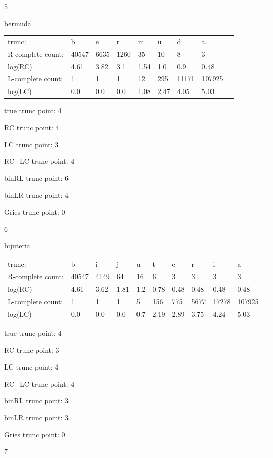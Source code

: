 \documentclass[10pt]{article}
\begin{document}
5

bermuda

\begin{tabular}{l|llllllll}
trunc: & b & e & r & m & u & d & a & \\ 
R-complete count: & 40547 & 6635 & 1260 & 35 & 10 & 8 & 3 & \\ 
log(RC) & 4.61 & 3.82 & 3.1 & 1.54 & 1.0 & 0.9 & 0.48 & \\ 
L-complete count: & 1 & 1 & 1 & 12 & 295 & 11171 & 107925 & \\ 
log(LC) & 0.0 & 0.0 & 0.0 & 1.08 & 2.47 & 4.05 & 5.03 & \\ 
\end{tabular}

true trunc point: 4

RC trunc point: 4

LC trunc point: 3

RC+LC trunc point: 4

binRL trunc point: 6

binLR trunc point: 4

Gries trunc point: 0

\vspace{1em}

6

bijuteria

\begin{tabular}{l|llllllllll}
trunc: & b & i & j & u & t & e & r & i & a & \\ 
R-complete count: & 40547 & 4149 & 64 & 16 & 6 & 3 & 3 & 3 & 3 & \\ 
log(RC) & 4.61 & 3.62 & 1.81 & 1.2 & 0.78 & 0.48 & 0.48 & 0.48 & 0.48 & \\ 
L-complete count: & 1 & 1 & 1 & 5 & 156 & 775 & 5677 & 17278 & 107925 & \\ 
log(LC) & 0.0 & 0.0 & 0.0 & 0.7 & 2.19 & 2.89 & 3.75 & 4.24 & 5.03 & \\ 
\end{tabular}

true trunc point: 4

RC trunc point: 3

LC trunc point: 4

RC+LC trunc point: 4

binRL trunc point: 3

binLR trunc point: 3

Gries trunc point: 0

\vspace{1em}

7
\end{document}
